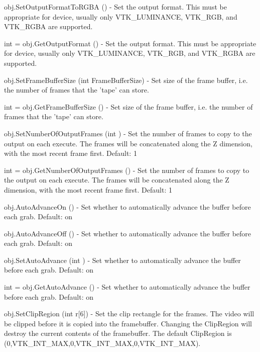 \begin{DoxyItemize}
\item {\ttfamily obj.\-Set\-Output\-Format\-To\-R\-G\-B\-A ()} -\/ Set the output format. This must be appropriate for device, usually only V\-T\-K\-\_\-\-L\-U\-M\-I\-N\-A\-N\-C\-E, V\-T\-K\-\_\-\-R\-G\-B, and V\-T\-K\-\_\-\-R\-G\-B\-A are supported.  
\item {\ttfamily int = obj.\-Get\-Output\-Format ()} -\/ Set the output format. This must be appropriate for device, usually only V\-T\-K\-\_\-\-L\-U\-M\-I\-N\-A\-N\-C\-E, V\-T\-K\-\_\-\-R\-G\-B, and V\-T\-K\-\_\-\-R\-G\-B\-A are supported.  
\item {\ttfamily obj.\-Set\-Frame\-Buffer\-Size (int Frame\-Buffer\-Size)} -\/ Set size of the frame buffer, i.\-e. the number of frames that the 'tape' can store.  
\item {\ttfamily int = obj.\-Get\-Frame\-Buffer\-Size ()} -\/ Set size of the frame buffer, i.\-e. the number of frames that the 'tape' can store.  
\item {\ttfamily obj.\-Set\-Number\-Of\-Output\-Frames (int )} -\/ Set the number of frames to copy to the output on each execute. The frames will be concatenated along the Z dimension, with the most recent frame first. Default\-: 1  
\item {\ttfamily int = obj.\-Get\-Number\-Of\-Output\-Frames ()} -\/ Set the number of frames to copy to the output on each execute. The frames will be concatenated along the Z dimension, with the most recent frame first. Default\-: 1  
\item {\ttfamily obj.\-Auto\-Advance\-On ()} -\/ Set whether to automatically advance the buffer before each grab. Default\-: on  
\item {\ttfamily obj.\-Auto\-Advance\-Off ()} -\/ Set whether to automatically advance the buffer before each grab. Default\-: on  
\item {\ttfamily obj.\-Set\-Auto\-Advance (int )} -\/ Set whether to automatically advance the buffer before each grab. Default\-: on  
\item {\ttfamily int = obj.\-Get\-Auto\-Advance ()} -\/ Set whether to automatically advance the buffer before each grab. Default\-: on  
\item {\ttfamily obj.\-Set\-Clip\-Region (int r\mbox{[}6\mbox{]})} -\/ Set the clip rectangle for the frames. The video will be clipped before it is copied into the framebuffer. Changing the Clip\-Region will destroy the current contents of the framebuffer. The default Clip\-Region is (0,V\-T\-K\-\_\-\-I\-N\-T\-\_\-\-M\-A\-X,0,V\-T\-K\-\_\-\-I\-N\-T\-\_\-\-M\-A\-X,0,V\-T\-K\-\_\-\-I\-N\-T\-\_\-\-M\-A\-X).  

\end{DoxyItemize}
